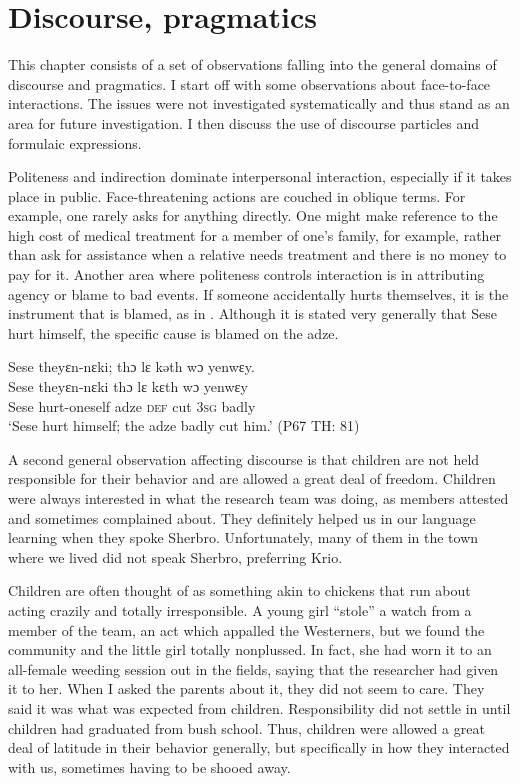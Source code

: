 \chapter{Discourse, pragmatics}
\label{ch:10}\hypertarget{Toc115517823}{}
This chapter consists of a set of observations falling into the general domains of discourse and pragmatics. I start off with some observations about face-to-face interactions. The issues were not investigated systematically and thus stand as an area for future investigation. I then discuss the use of discourse particles and formulaic expressions.

Politeness and indirection dominate interpersonal interaction, especially if it takes place in public. Face-threatening actions are couched in oblique terms. For example, one rarely asks for anything directly. One might make reference to the high cost of medical treatment for a member of one's family, for example, rather than ask for assistance when a relative needs treatment and there is no money to pay for it. Another area where politeness controls interaction is in attributing agency or blame to bad events. If someone accidentally hurts themselves, it is the instrument that is blamed, as in . Although it is stated very generally that Sese hurt himself, the specific cause is blamed on the adze.

\ea%
    \label{ex:241}
      Sese theyɛn-nɛki; thɔ lɛ kəth wɔ   yenwɛy.\\
      \gll Sese  theyɛn-nɛki    thɔ  lɛ    kɛth  wɔ   yenwɛy\\
      Sese  hurt-oneself    adze  \textsc{def}  cut  \textsc{3sg}  badly\\
      \glt ‘Sese hurt himself; the adze badly cut him.' (P67 TH: 81)
\z

A second general observation affecting discourse is that children are not held responsible for their behavior and are allowed a great deal of freedom. Children were always interested in what the research team was doing, as members attested and sometimes complained about. They definitely helped us in our language learning when they spoke Sherbro. Unfortunately, many of them in the town where we lived did not speak Sherbro, preferring Krio.

Children are often thought of as something akin to chickens that run about acting crazily and totally irresponsible. A young girl “stole” a watch from a member of the team, an act which appalled the Westerners, but we found the community and the little girl totally nonplussed. In fact, she had worn it to an all-female weeding session out in the fields, saying that the researcher had given it to her. When I asked the parents about it, they did not seem to care. They said it was what was expected from children. Responsibility did not settle in until children had graduated from bush school. Thus, children were allowed a great deal of latitude in their behavior generally, but specifically in how they interacted with us, sometimes having to be shooed away.

